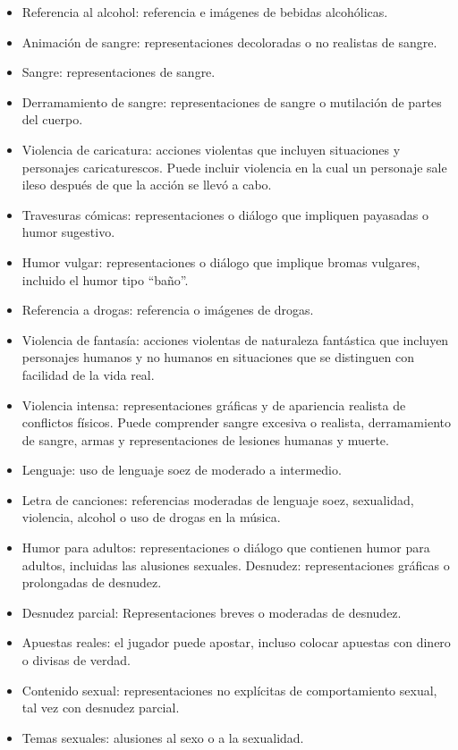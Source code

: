 			\begin{itemize}
				\item Referencia al alcohol: referencia e imágenes de bebidas alcohólicas.
				\item Animación de sangre: representaciones decoloradas o no realistas de sangre.
				\item Sangre: representaciones de sangre.
				\item Derramamiento de sangre: representaciones de sangre o mutilación de partes del cuerpo.
				\item Violencia de caricatura: acciones violentas que incluyen situaciones y personajes caricaturescos. Puede incluir violencia en la cual un personaje sale ileso después de que la acción se llevó a cabo.
				\item Travesuras cómicas: representaciones o diálogo que impliquen payasadas o humor sugestivo.
				\item Humor vulgar: representaciones o diálogo que implique bromas vulgares, incluido el humor tipo “baño”.
				\item Referencia a drogas: referencia o imágenes de drogas.
				\item Violencia de fantasía: acciones violentas de naturaleza fantástica que incluyen personajes humanos y no humanos en situaciones que se distinguen con facilidad de la vida real.
				\item Violencia intensa: representaciones gráficas y de apariencia realista de conflictos físicos. Puede comprender sangre excesiva o realista, derramamiento de sangre, armas y representaciones de lesiones humanas y muerte.
				\item Lenguaje: uso de lenguaje soez de moderado a intermedio.
				\item Letra de canciones: referencias moderadas de lenguaje soez, sexualidad, violencia, alcohol o uso de drogas en la música.
				\item Humor para adultos: representaciones o diálogo que contienen humor para adultos, incluidas las alusiones sexuales.
				Desnudez: representaciones gráficas o prolongadas de desnudez.
				\item Desnudez parcial: Representaciones breves o moderadas de desnudez.
				\item Apuestas reales: el jugador puede apostar, incluso colocar apuestas con dinero o divisas de verdad.
				\item Contenido sexual: representaciones no explícitas de comportamiento sexual, tal vez con desnudez parcial.
				\item Temas sexuales: alusiones al sexo o a la sexualidad.

\end{itemize}
